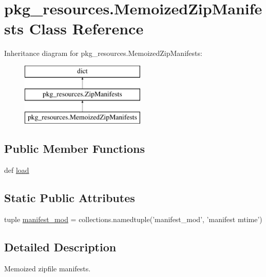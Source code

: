\hypertarget{classpkg__resources_1_1MemoizedZipManifests}{}\section{pkg\+\_\+resources.\+Memoized\+Zip\+Manifests Class Reference}
\label{classpkg__resources_1_1MemoizedZipManifests}
Inheritance diagram for pkg\+\_\+resources.\+Memoized\+Zip\+Manifests\+:\begin{figure}[H]
\begin{center}
\leavevmode
\includegraphics[height=3.000000cm]{classpkg__resources_1_1MemoizedZipManifests}
\end{center}
\end{figure}
\subsection*{Public Member Functions}
\begin{DoxyCompactItemize}
\item 
def \hyperlink{classpkg__resources_1_1MemoizedZipManifests_aaf7195e10821cff0924952912ae55ac3}{load}
\end{DoxyCompactItemize}
\subsection*{Static Public Attributes}
\begin{DoxyCompactItemize}
\item 
tuple \hyperlink{classpkg__resources_1_1MemoizedZipManifests_af9fca8f2e4b96863a8afa9dd0b419144}{manifest\+\_\+mod} = collections.\+namedtuple('manifest\+\_\+mod', 'manifest mtime')
\end{DoxyCompactItemize}


\subsection{Detailed Description}
\begin{DoxyVerb}Memoized zipfile manifests.
\end{DoxyVerb}
 

